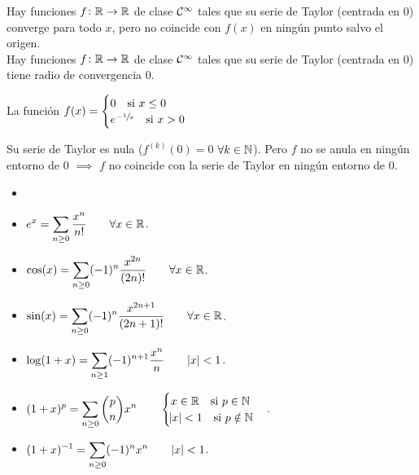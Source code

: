 \begin{obs}
    Hay funciones $f \colon \mathbb{R} \to \mathbb{R}$ de clase $\mathcal{C}^\infty$ tales que su
    serie de Taylor (centrada en 0) converge para todo $x$, pero no coincide con
    $f(x)$ en ningún punto salvo el origen. \\
    Hay funciones $f \colon \mathbb{R} \to \mathbb{R}$ de clase $\mathcal{C}^\infty$ tales que su
    serie de Taylor (centrada en 0) tiene radio de convergencia 0.
\end{obs}

\begin{example*}
    La función $f(x) = \begin{cases} 0 \quad \text{si } x \leq 0 \\
    e^{-\sfrac{1}{x}} \quad \text{si } x > 0 \end{cases}$
    \begin{center}
    \end{center}
    Su serie de Taylor es nula ($f^{(k)}(0) = 0$ $\forall k \in \mathbb{N}$). Pero $f$ no
    se anula en ningún entorno de 0 $\implies$ $f$ no coincide con la serie de
    Taylor en ningún entorno de 0.
\end{example*}

\begin{prop}
    \begin{itemize}
        \item[]
        \item $\displaystyle e^x = \sum_{n \geq 0} \frac{x^n}{n!}
            \qquad \forall x \in \mathbb{R}$.
        \item $\displaystyle \cos(x) = \sum_{n \geq 0} (-1)^{n}\frac{x^{2n}}{(2n)!}
            \qquad \forall x \in \mathbb{R}$.
        \item $\displaystyle \sin(x) = \sum_{n \geq 0} (-1)^{n}\frac{x^{2n+1}}{(2n+1)!}
            \qquad \forall x \in \mathbb{R}$.
        \item $\displaystyle \log(1+x) = \sum_{n \geq 1} (-1)^{n+1} \frac{x^n}{n}
            \qquad \abs{x} < 1$.
        \item $\displaystyle (1+x)^p = \sum_{n \geq 0} {p \choose n} x^n \qquad
            \begin{cases} x \in \mathbb{R} \quad \text{si } p \in \mathbb{N} \\ \abs{x} < 1
            \quad \text{si } p \notin \mathbb{N} \end{cases}$.
        \item $\displaystyle (1+x)^{-1} = \sum_{n \geq 0} (-1)^n x^n \qquad \abs{x} < 1$.
    \end{itemize}
\end{prop}

